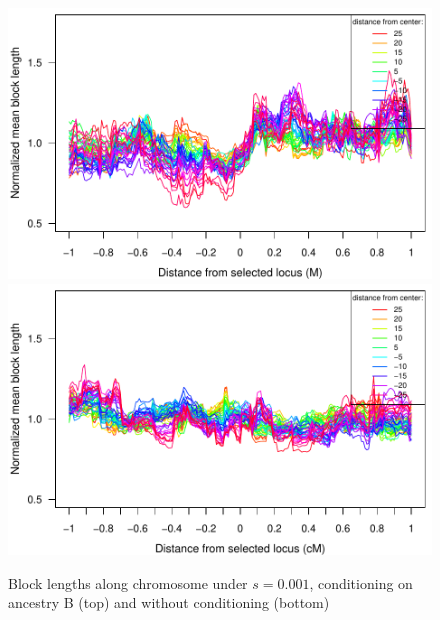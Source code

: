 \begin{figure}
    \includegraphics{figs/s001_adjacentBlocksAlongChromAncBConditioning}
    \includegraphics{figs/s001_adjacentBlocksAlongChromNoConditioningHighRes}
        \caption{
     Block lengths along chromosome under $s=0.001$, conditioning on ancestry B (top) and without conditioning (bottom) } \label{sfig:blockLengthPlot_t1000_s0.001}
\end{figure}




% 
